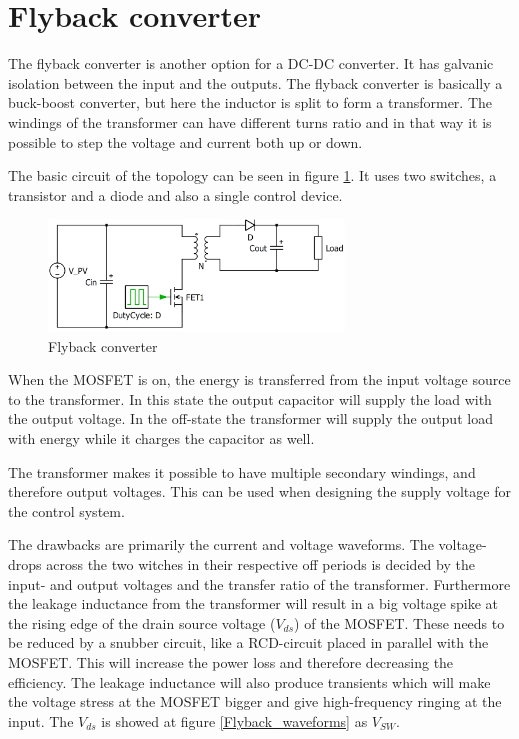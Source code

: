 \section{Flyback converter}

The flyback converter is another option for a DC-DC converter. It has galvanic isolation between the input and the outputs. The flyback converter is basically a buck-boost converter, but here the inductor is split to form a transformer. The windings of the transformer can have different turns ratio and in that way it is possible to step the voltage and current both up or down. 

The basic circuit of the topology can be seen in figure \ref{Flyback_SCHEMATIC}. It uses two switches, a transistor and a diode and also a single control device.    

\begin{figure}[H]
	\begin{center}
	\includegraphics[width=0.7\textwidth]{../Pictures/flyback_schem.png}
	\caption{Flyback converter}
	\label{Flyback_SCHEMATIC}
	\end{center}
\end{figure}

When the MOSFET is on, the energy is transferred from the input voltage source to the transformer. In this state the output capacitor will supply the load with the output voltage. In the off-state the transformer will supply the output load with energy while it charges the capacitor as well\cite{flyback}. 

The transformer makes it possible to have multiple secondary windings, and therefore output voltages. This can be used when designing the supply voltage for the control system\cite{flyback}.  

The drawbacks are primarily the current and voltage waveforms. The voltage-drops across the two witches in their respective off periods is decided by the input- and output voltages and the transfer ratio of the transformer. Furthermore the leakage inductance from the transformer will result in a big voltage spike at the rising edge of the drain source voltage ($V_{ds}$) of the MOSFET. These needs to be reduced by a snubber circuit, like a RCD-circuit placed in parallel with the MOSFET\cite{flyback}. This will increase the power loss and therefore decreasing the efficiency. The leakage inductance will also produce transients which will make the voltage stress at the MOSFET bigger and give high-frequency ringing at the input\cite{underthehood}. The $V_{ds}$ is showed at figure \ref{Flyback_waveforms} as $V_{SW}$.

